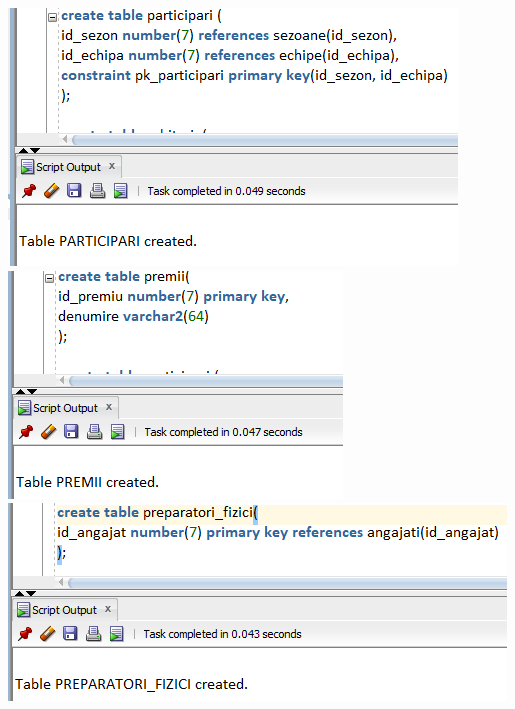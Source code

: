 \documentclass{article}
\begin{document}
\begin{multicols*}{4}
\vspace{4em}
\includegraphics[width=\linewidth]{creation/participari}
\vspace{4em}
\includegraphics[width=\linewidth]{creation/premii}
\vspace{4em}
\includegraphics[width=\linewidth]{creation/preparatori}
\vspace{4em}

\end{multicols*}
\end{document}
